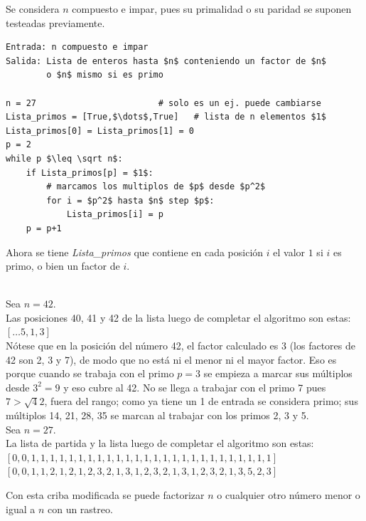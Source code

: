 Se considera $n$ compuesto e impar, pues su primalidad o su paridad se suponen testeadas previamente.

\begin{lstlisting}[caption={Factorización vía criba de Eratóstenes}, label={alg:AlgCribaErat}, mathescape=true]
Entrada: n compuesto e impar
Salida: Lista de enteros hasta $n$ conteniendo un factor de $n$ 
        o $n$ mismo si es primo

n = 27                        # solo es un ej. puede cambiarse
Lista_primos = [True,$\dots$,True]   # lista de n elementos $1$
Lista_primos[0] = Lista_primos[1] = 0 
p = 2
while p $\leq \sqrt n$:
    if Lista_primos[p] = $1$:
        # marcamos los multiplos de $p$ desde $p^2$
        for i = $p^2$ hasta $n$ step $p$:
            Lista_primos[i] = p
    p = p+1
\end{lstlisting}

Ahora se tiene \textit{Lista\_primos} que contiene en cada posición $i$ el valor $1$ si $i$ es primo, o bien un factor de $i$. 

\begin{ejemplo} \, \\
Sea $n = 42$. \\
Las posiciones 40, 41 y 42 de la lista luego de completar el algoritmo son estas: \\
$\left[ \dots 5, 1, 3 \right]$ \\
Nótese que en la posición del número 42, el factor calculado es 3 (los factores de 42 son 2, 3 y 7), de modo que no está ni el menor ni el mayor factor. Eso es porque cuando se trabaja con el primo $p=3$ se empieza a marcar sus múltiplos desde $3^2=9$ y eso cubre al 42. No se llega a trabajar con el primo 7 pues $7 > \sqrt42$, fuera del rango; como ya tiene un 1 de entrada se considera primo; sus múltiplos 14, 21, 28, 35 se marcan al trabajar con los primos 2, 3 y 5. \\
Sea $n = 27$. \\
La lista de partida y la lista luego de completar el algoritmo son estas: \\
$\left[0, 0, 1, 1, 1, 1, 1, 1, 1, 1, 1, 1, 1, 1, 1, 1, 1, 1, 1, 1, 1, 1, 1, 1, 1, 1, 1, 1 \right]$ \\
$\left[0, 0, 1, 1, 2, 1, 2, 1, 2, 3, 2, 1, 3, 1, 2, 3, 2, 1, 3, 1, 2, 3, 2, 1, 3, 5, 2, 3 \right]$ 
\end{ejemplo}

Con esta criba modificada se puede factorizar $n$ o cualquier otro número menor o igual a $n$ con un rastreo. 

